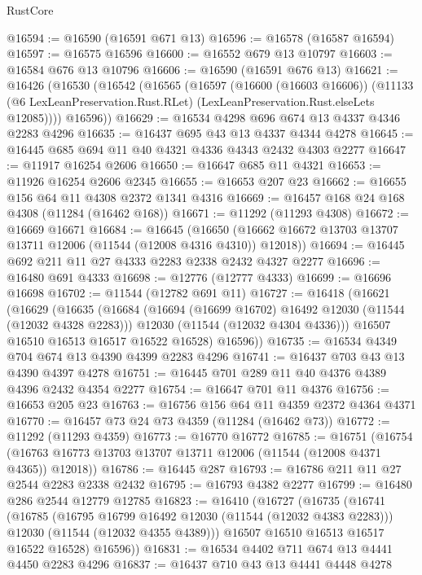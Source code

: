 \begin{lexlean}{RustCore}
\begin{coremodule}
@16594 := @16590 (@16591 @671 @13)
@16596 := @16578 (@16587 @16594)
@16597 := @16575 @16596
@16600 := @16552 @679 @13 @10797
@16603 := @16584 @676 @13 @10796
@16606 := @16590 (@16591 @676 @13)
@16621 := @16426
    (@16530
      (@16542
        (@16565
          (@16597
            (@16600 (@16603 @16606))
            (@11133 (@6 LexLeanPreservation.Rust.RLet) (LexLeanPreservation.Rust.elseLets @12085))))
        @16596))
@16629 := @16534 @4298 @696 @674 @13 @4337 @4346 @2283 @4296
@16635 := @16437 @695 @43 @13 @4337 @4344 @4278
@16645 := @16445 @685 @694 @11 @40 @4321 @4336 @4343 @2432 @4303 @2277
@16647 := @11917 @16254 @2606
@16650 := @16647 @685 @11 @4321
@16653 := @11926 @16254 @2606 @2345
@16655 := @16653 @207 @23
@16662 := @16655 @156 @64 @11 @4308 @2372 @1341 @4316
@16669 := @16457 @168 @24 @168 @4308 (@11284 (@16462 @168))
@16671 := @11292 (@11293 @4308)
@16672 := @16669 @16671
@16684 := @16645
    (@16650 (@16662 @16672 @13703 @13707 @13711 @12006 (@11544 (@12008 @4316 @4310)) @12018))
@16694 := @16445 @692 @211 @11 @27 @4333 @2283 @2338 @2432 @4327 @2277
@16696 := @16480 @691 @4333
@16698 := @12776 (@12777 @4333)
@16699 := @16696 @16698
@16702 := @11544 (@12782 @691 @11)
@16727 := @16418
    (@16621
      (@16629
        (@16635
          (@16684
            (@16694 (@16699 @16702) @16492 @12030 (@11544 (@12032 @4328 @2283)))
            @12030
            (@11544 (@12032 @4304 @4336)))
          @16507
          @16510
          @16513
          @16517
          @16522
          @16528)
        @16596))
@16735 := @16534 @4349 @704 @674 @13 @4390 @4399 @2283 @4296
@16741 := @16437 @703 @43 @13 @4390 @4397 @4278
@16751 := @16445 @701 @289 @11 @40 @4376 @4389 @4396 @2432 @4354 @2277
@16754 := @16647 @701 @11 @4376
@16756 := @16653 @205 @23
@16763 := @16756 @156 @64 @11 @4359 @2372 @4364 @4371
@16770 := @16457 @73 @24 @73 @4359 (@11284 (@16462 @73))
@16772 := @11292 (@11293 @4359)
@16773 := @16770 @16772
@16785 := @16751
    (@16754 (@16763 @16773 @13703 @13707 @13711 @12006 (@11544 (@12008 @4371 @4365)) @12018))
@16786 := @16445 @287
@16793 := @16786 @211 @11 @27 @2544 @2283 @2338 @2432
@16795 := @16793 @4382 @2277
@16799 := @16480 @286 @2544 @12779 @12785
@16823 := @16410
    (@16727
      (@16735
        (@16741
          (@16785
            (@16795 @16799 @16492 @12030 (@11544 (@12032 @4383 @2283)))
            @12030
            (@11544 (@12032 @4355 @4389)))
          @16507
          @16510
          @16513
          @16517
          @16522
          @16528)
        @16596))
@16831 := @16534 @4402 @711 @674 @13 @4441 @4450 @2283 @4296
@16837 := @16437 @710 @43 @13 @4441 @4448 @4278

\end{coremodule}
\end{lexlean}
